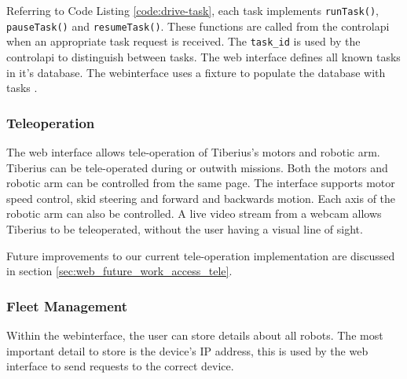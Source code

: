 Referring to Code Listing \ref{code:drive-task}, each task implements \texttt{runTask()}, \texttt{pauseTask()} and \texttt{resumeTask()}. These functions are called from the \gls{controlapi} when an appropriate task request is received. The \texttt{task\_id} is used by the \gls{controlapi} to distinguish between tasks. The web interface defines all known tasks in it's database. The \gls{webinterface} uses a fixture to populate the database with tasks \cite{github-fixtures}.


\subsubsection{Teleoperation}

The web interface allows tele-operation of Tiberius's motors and robotic arm. Tiberius can be tele-operated during or outwith missions. Both the motors and robotic arm can be controlled from the same page. The interface supports motor speed control, skid steering and forward and backwards motion. Each axis of the robotic arm can also be controlled. A live video stream from a webcam allows Tiberius to be teleoperated, without the user having a visual line of sight.

Future improvements to our current tele-operation implementation are discussed in section \ref{sec:web_future_work_access_tele}.


\subsubsection{Fleet Management}
Within the \gls{webinterface}, the user can store details about all robots. The most important detail to store is the device's IP address, this is used by the web interface to send requests to the correct device. 